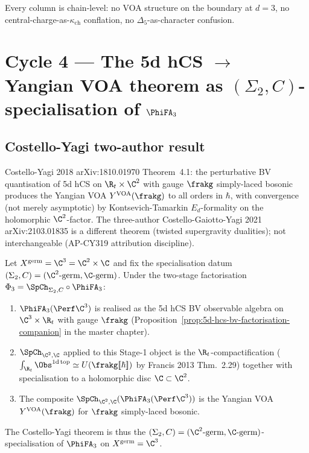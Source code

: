 Every column is chain-level: no VOA structure on the boundary at $d = 3$,
no central-charge-as-$\kappa_{\mathrm{ch}}$ conflation, no
$\Delta_5$-as-character confusion.

\section{Cycle 4 --- The 5d hCS $\to$ Yangian VOA theorem as
$(\Sigma_2, C)$-specialisation of $\PhiFA_3$}
\label{sec:agent12-5d-hcs-yangian}

\subsection*{Costello-Yagi two-author result}

Costello-Yagi 2018 arXiv:1810.01970 Theorem~4.1: the perturbative BV
quantisation of 5d hCS on $\R_t \times \C^2$ with gauge $\frakg$
simply-laced bosonic produces the Yangian VOA $Y^{\mathrm{VOA}}(\frakg)$
to all orders in $\hbar$, with convergence (not merely asymptotic) by
Kontsevich-Tamarkin $E_d$-formality on the holomorphic $\C^2$-factor.
The three-author Costello-Gaiotto-Yagi 2021 arXiv:2103.01835 is a
different theorem (twisted supergravity dualities); not interchangeable
(AP-CY319 attribution discipline).

\begin{proposition}
\label{prop:agent12-A4-costello-yagi-as-spch}
Let $X^{\mathrm{germ}} = \C^3 = \C^2 \times \C$ and fix the
specialisation datum $(\Sigma_2, C) = (\C^2\text{-germ}, \C\text{-germ})$.
Under the two-stage factorisation $\Phi_3 = \SpCh_{\Sigma_2, C} \circ
\PhiFA_3$:
\begin{enumerate}[label=\textup{(\roman*)}]
\item $\PhiFA_3(\Perf \C^3)$ is realised as the 5d hCS BV observable
algebra on $\C^3 \times \R_t$ with gauge $\frakg$
(Proposition~\ref{prop:5d-hcs-bv-factorisation-companion} in the
master chapter).
\item $\SpCh_{\C^2, \C}$ applied to this Stage-1 object is the
$\R_t$-compactification ($\int_{\R_t} \Obs^{1\mathrm{d\,top}}
\simeq U(\frakg[\![\hbar]\!])$ by Francis 2013 Thm.~2.29) together with
specialisation to a holomorphic disc $\C \subset \C^2$.
\item The composite $\SpCh_{\C^2, \C}(\PhiFA_3(\Perf \C^3))$ is the
Yangian VOA $Y^{\mathrm{VOA}}(\frakg)$ for $\frakg$ simply-laced
bosonic.
\end{enumerate}
The Costello-Yagi theorem is thus the
$(\Sigma_2, C) = (\C^2\text{-germ}, \C\text{-germ})$-specialisation of
$\PhiFA_3$ on $X^{\mathrm{germ}} = \C^3$.
\end{proposition}

